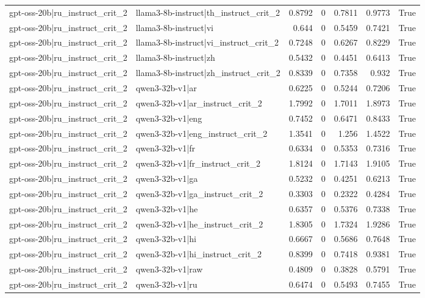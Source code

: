 \begin{table}
\begin{tabular}{l l r r r r l}
gpt-oss-20b|ru_instruct_crit_2 & llama3-8b-instruct|th_instruct_crit_2 & 0.8792 & 0 & 0.7811 & 0.9773 & True \\
gpt-oss-20b|ru_instruct_crit_2 & llama3-8b-instruct|vi & 0.644 & 0 & 0.5459 & 0.7421 & True \\
gpt-oss-20b|ru_instruct_crit_2 & llama3-8b-instruct|vi_instruct_crit_2 & 0.7248 & 0 & 0.6267 & 0.8229 & True \\
gpt-oss-20b|ru_instruct_crit_2 & llama3-8b-instruct|zh & 0.5432 & 0 & 0.4451 & 0.6413 & True \\
gpt-oss-20b|ru_instruct_crit_2 & llama3-8b-instruct|zh_instruct_crit_2 & 0.8339 & 0 & 0.7358 & 0.932 & True \\
gpt-oss-20b|ru_instruct_crit_2 & qwen3-32b-v1|ar & 0.6225 & 0 & 0.5244 & 0.7206 & True \\
gpt-oss-20b|ru_instruct_crit_2 & qwen3-32b-v1|ar_instruct_crit_2 & 1.7992 & 0 & 1.7011 & 1.8973 & True \\
gpt-oss-20b|ru_instruct_crit_2 & qwen3-32b-v1|eng & 0.7452 & 0 & 0.6471 & 0.8433 & True \\
gpt-oss-20b|ru_instruct_crit_2 & qwen3-32b-v1|eng_instruct_crit_2 & 1.3541 & 0 & 1.256 & 1.4522 & True \\
gpt-oss-20b|ru_instruct_crit_2 & qwen3-32b-v1|fr & 0.6334 & 0 & 0.5353 & 0.7316 & True \\
gpt-oss-20b|ru_instruct_crit_2 & qwen3-32b-v1|fr_instruct_crit_2 & 1.8124 & 0 & 1.7143 & 1.9105 & True \\
gpt-oss-20b|ru_instruct_crit_2 & qwen3-32b-v1|ga & 0.5232 & 0 & 0.4251 & 0.6213 & True \\
gpt-oss-20b|ru_instruct_crit_2 & qwen3-32b-v1|ga_instruct_crit_2 & 0.3303 & 0 & 0.2322 & 0.4284 & True \\
gpt-oss-20b|ru_instruct_crit_2 & qwen3-32b-v1|he & 0.6357 & 0 & 0.5376 & 0.7338 & True \\
gpt-oss-20b|ru_instruct_crit_2 & qwen3-32b-v1|he_instruct_crit_2 & 1.8305 & 0 & 1.7324 & 1.9286 & True \\
gpt-oss-20b|ru_instruct_crit_2 & qwen3-32b-v1|hi & 0.6667 & 0 & 0.5686 & 0.7648 & True \\
gpt-oss-20b|ru_instruct_crit_2 & qwen3-32b-v1|hi_instruct_crit_2 & 0.8399 & 0 & 0.7418 & 0.9381 & True \\
gpt-oss-20b|ru_instruct_crit_2 & qwen3-32b-v1|raw & 0.4809 & 0 & 0.3828 & 0.5791 & True \\
gpt-oss-20b|ru_instruct_crit_2 & qwen3-32b-v1|ru & 0.6474 & 0 & 0.5493 & 0.7455 & True \\

\end{tabular}
\end{table}
